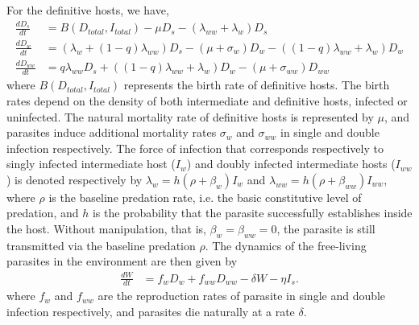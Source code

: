 \documentclass[a4paper]{scrartcl}
\begin{document}
For the definitive hosts, we have,
%
\begin{align}
\frac{dD_s}{dt} &= B(D_{total},  I_{total})  - \mu D_s - (\lambda_{ww} + \lambda_w) D_s \nonumber \\    
\frac{dD_w}{dt} &= (\lambda_w + (1 - q) \lambda_{ww}) D_s - (\mu + \sigma_w) D_w - ((1 - q) \lambda_{ww} + \lambda_w) D_w  \label{odes:dhosts} \\         
\frac{dD_{ww}}{dt} &= q \lambda_{ww} D_s + ((1 - q) \lambda_{ww} + \lambda_w) D_w - (\mu + \sigma_{ww}) D_{ww} \nonumber
\end{align}
%
where $B(D_{total},  I_{total})$ represents the birth rate of definitive hosts.
The birth rates depend on the density of both intermediate and definitive hosts, infected or uninfected. 
The natural mortality rate of definitive hosts is represented by $\mu$, and parasites induce additional mortality rates $\sigma_w$ and $\sigma_{ww}$ in single and double infection respectively.
The force of infection that corresponds respectively to singly infected intermediate host ($I_w$) and doubly infected intermediate hosts ($I_{ww}$) is denoted respectively by $\lambda_w = h (\rho + \beta_w)  I_w$ and $\lambda_{ww} = h (\rho + \beta_{ww}) I_{ww}$, where $\rho$ is the baseline predation rate, i.e. the basic constitutive level of predation, and $h$ is the probability that the parasite successfully establishes inside the host.
Without manipulation, that is, $\beta_w = \beta_{ww} = 0$, the parasite is still transmitted via the baseline predation $\rho$. 
The dynamics of the free-living parasites in the environment are then given by
\begin{align}
	\frac{dW}{dt} &= f_w D_w + f_{ww} D_{ww} - \delta W - \eta I_s. \label{odes:eparasite}
\end{align}
where $f_w$ and $f_{ww}$ are the reproduction rates of parasite in single and double infection respectively, and parasites die naturally at a rate $\delta$.
\end{document}
